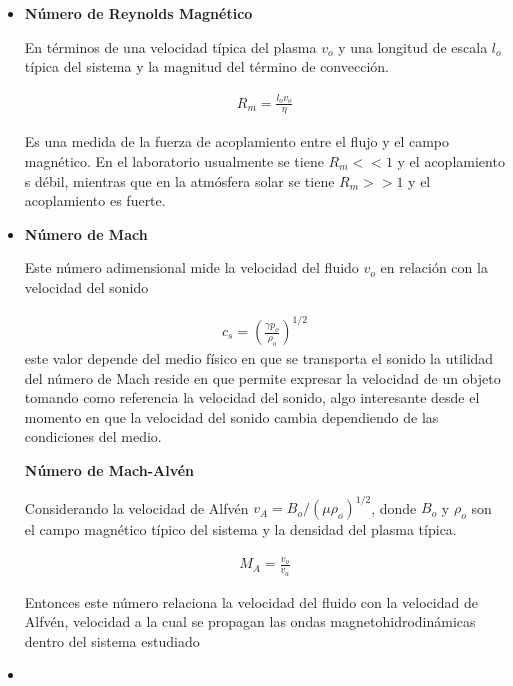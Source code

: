 \begin{itemize}
    \item \textbf{Número de Reynolds Magnético}
    
    \noindent En términos de una velocidad típica del plasma $v_{o}$ y una longitud de escala $l_{o}$ típica del sistema y la magnitud del término de convección.

    \begin{eqnarray}
    R_{m} = \frac{l_{o}v_{o}}{\eta}
    \end{eqnarray}
    
    \noindent Es una medida de la fuerza de acoplamiento entre el flujo y el campo magnético. En el laboratorio usualmente se tiene $R_{m} << 1$ y el acoplamiento s débil, mientras que en la atmósfera solar se tiene $R_{m} >> 1$ y el acoplamiento es fuerte.

    \item
    
    \noindent \textbf{Número de Mach}
    
    \noindent Este número adimensional mide la velocidad del fluido $v_{o}$ en relación con la velocidad del sonido 
    
    \begin{eqnarray}
        c_{s} = \left(\frac{\gamma p_{o}}{\rho_{o}}\right)^{1/2}
    \end{eqnarray}
    este valor depende del medio físico en que se transporta el sonido la utilidad del número de Mach reside en que permite expresar la velocidad de un objeto tomando como referencia la velocidad del sonido, algo interesante desde el momento en que la velocidad del sonido cambia dependiendo de las condiciones del medio.
    
    \time 
    
    \noindent \textbf{Número de Mach-Alvén }
    
    \noindent Considerando la velocidad de Alfvén $v_{A} = B_{o}/(\mu \rho_{o})^{1/2}$, donde $B_{o}$ y $\rho_{o}$ son el campo magnético típico del sistema y la densidad del plasma típica. 
    
    \begin{eqnarray}
    M_{A} = \frac{v_{o}}{v_{a}}
    \end{eqnarray}
    
    Entonces este número relaciona la velocidad del fluido con la velocidad de Alfvén, velocidad a la cual se propagan las ondas magnetohidrodinámicas dentro del sistema estudiado 
    
    \item 
    

\end{itemize}
